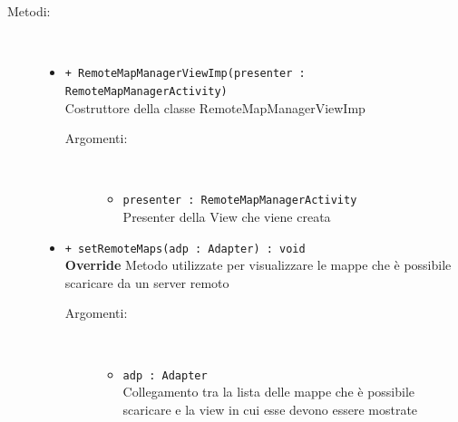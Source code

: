 \documentclass[../DefinizioneDiProdotto.tex]{subfiles}
\begin{document}
\begin{description}
\begin{itemize}
\end{itemize}
\item[Metodi:] \
\begin{itemize}
\item \texttt{+ RemoteMapManagerViewImp(presenter : RemoteMapManagerActivity)}\\
Costruttore della classe RemoteMapManagerViewImp
 \begin{description}
\item[Argomenti:] \
\begin{itemize}
\item \texttt{presenter : RemoteMapManagerActivity}\\
Presenter della View che viene creata\end{itemize}
\end{description}
\item \texttt{+ setRemoteMaps(adp : Adapter) : void}\\
\textbf{Override} Metodo utilizzate per visualizzare le mappe che è possibile scaricare da un server remoto
 \begin{description}
\item[Argomenti:] \
\begin{itemize}
\item \texttt{adp : Adapter}\\
Collegamento tra la lista delle mappe che è possibile scaricare e la view in cui esse devono essere mostrate\end{itemize}
\end{description}
\end{itemize}
\end{description}
 
 
	
	
\end{document}
